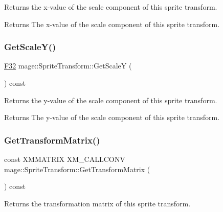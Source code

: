 Returns the x-\/value of the scale component of this sprite transform.

\begin{DoxyReturn}{Returns}
The x-\/value of the scale component of this sprite transform. 
\end{DoxyReturn}
\mbox{\label{classmage_1_1_sprite_transform_a07010f5d7e781ca641456b18fd16e67f}} 
\subsubsection{\texorpdfstring{Get\+Scale\+Y()}{GetScaleY()}}
{\footnotesize\ttfamily \mbox{\hyperlink{namespacemage_aa97e833b45f06d60a0a9c4fc22ae02c0}{F32}} mage\+::\+Sprite\+Transform\+::\+Get\+ScaleY (\begin{DoxyParamCaption}{ }\end{DoxyParamCaption}) const\hspace{0.3cm}{\ttfamily [noexcept]}}

Returns the y-\/value of the scale component of this sprite transform.

\begin{DoxyReturn}{Returns}
The y-\/value of the scale component of this sprite transform. 
\end{DoxyReturn}
\mbox{\label{classmage_1_1_sprite_transform_ac9d30bb4a52ababcdee4514aac7f7402}} 
\subsubsection{\texorpdfstring{Get\+Transform\+Matrix()}{GetTransformMatrix()}}
{\footnotesize\ttfamily const X\+M\+M\+A\+T\+R\+IX X\+M\+\_\+\+C\+A\+L\+L\+C\+O\+NV mage\+::\+Sprite\+Transform\+::\+Get\+Transform\+Matrix (\begin{DoxyParamCaption}{ }\end{DoxyParamCaption}) const\hspace{0.3cm}{\ttfamily [noexcept]}}

Returns the transformation matrix of this sprite transform.

